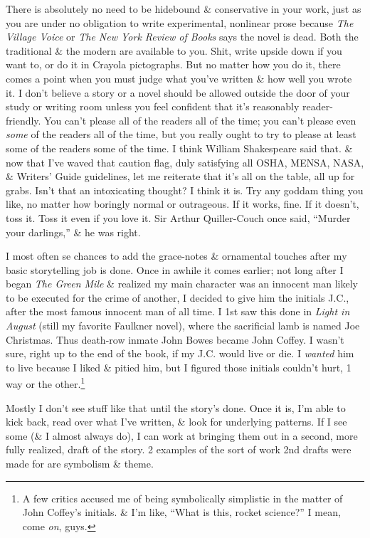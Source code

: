\documentclass{article}
\numberwithin{equation}{section}
\begin{document}
There is absolutely no need to be hidebound \& conservative in your work, just as you are under no obligation to write experimental, nonlinear prose because \textit{The Village Voice} or \textit{The New York Review of Books} says the novel is dead. Both the traditional \& the modern are available to you. Shit, write upside down if you want to, or do it in Crayola pictographs. But no matter how you do it, there comes a point when you must judge what you've written \& how well you wrote it. I don't believe a story or a novel should be allowed outside the door of your study or writing room unless you feel confident that it's reasonably reader-friendly. You can't please all of the readers all of the time; you can't please even \textit{some} of the readers all of the time, but you really ought to try to please at least some of the readers some of the time. I think William Shakespeare said that. \& now that I've waved that caution flag, duly satisfying all OSHA, MENSA, NASA, \& Writers' Guide guidelines, let me reiterate that it's all on the table, all up for grabs. Isn't that an intoxicating thought? I think it is. Try any goddam thing you like, no matter how boringly normal or outrageous. If it works, fine. If it doesn't, toss it. Toss it even if you love it. Sir Arthur Quiller-Couch once said, ``Murder your darlings,'' \& he was right.

I most often se chances to add the grace-notes \& ornamental touches after my basic storytelling job is done. Once in awhile it comes earlier; not long after I began \textit{The Green Mile} \& realized my main character was an innocent man likely to be executed for the crime of another, I decided to give him the initials J.C., after the most famous innocent man of all time. I 1st saw this done in \textit{Light in August} (still my favorite Faulkner novel), where the sacrificial lamb is named Joe Christmas. Thus death-row inmate John Bowes became John Coffey. I wasn't sure, right up to the end of the book, if my J.C. would live or die. I \textit{wanted} him to live because I liked \& pitied him, but I figured those initials couldn't hurt, 1 way or the other.\footnote{A few critics accused me of being symbolically simplistic in the matter of John Coffey's initials. \& I'm like, ``What is this, rocket science?'' I mean, come \textit{on}, guys.}

Mostly I don't see stuff like that until the story's done. Once it is, I'm able to kick back, read over what I've written, \& look for underlying patterns. If I see some (\& I almost always do), I can work at bringing them out in a second, more fully realized, draft of the story. 2 examples of the sort of work 2nd drafts were made for are symbolism \& theme.
\end{document}
